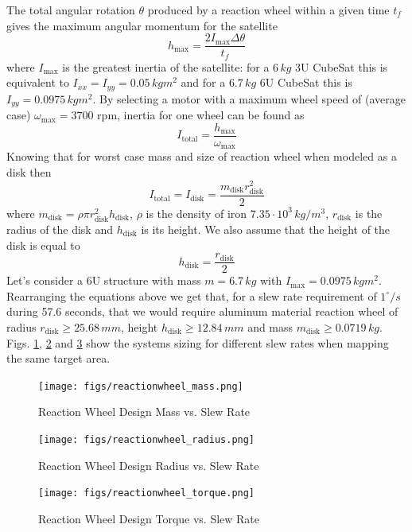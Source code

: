 The total angular rotation $\theta$ produced by a reaction wheel within a given time $t_f$ gives the maximum angular momentum for the satellite 
\begin{equation}
    h_{\text{max}} = \frac{2I_{\text{max}}\Delta \theta}{t_f}
\end{equation}
where $I_{\text{max}}$ is the greatest inertia of the satellite: for a $6 \hspace{2pt} kg$ 3U CubeSat this is equivalent to $I_{xx}=I_{yy}=0.05 \hspace{2pt} kgm^2$ and for a $6.7 \hspace{2pt} kg$ 6U CubeSat this is $I_{yy}=0.0975 \hspace{2pt} kgm^2$. By selecting a motor with a maximum wheel speed of (average case) $\omega_{\text{max}}=3700$ rpm, inertia for one wheel can be found as
\begin{equation}
    I_{\text{total}} = \frac{ h_{\text{max}}}{\omega_{\text{max}}}
\end{equation}
Knowing that for worst case mass and size of reaction wheel when modeled as a disk then
\begin{equation}
    I_{\text{total}} = I_{\text{disk}} = \frac{m_{\text{disk}}r^2_{\text{disk}}}{2}
\end{equation}
where $m_{\text{disk}}=\rho\pi r^2_{\text{disk}}h_{\text{disk}}$, $\rho$ is the density of iron $7.35\cdot10^{3} \hspace{2pt} kg/m^3$, $r_{\text{disk}}$ is the radius of the disk and $h_{\text{disk}}$ is its height. We also assume that the height of the disk is equal to
\begin{equation}
    h_{\text{disk}} = \frac{r_{\text{disk}}}{2}
\end{equation}
Let's consider a 6U structure with mass $m = 6.7 \hspace{2pt} kg$ with $I_{\text{max}}=0.0975 \hspace{2pt} kgm^2$. Rearranging the equations above we get that, for a slew rate requirement of $1^{\circ}/s$ during 57.6 seconds, that we would require aluminum material reaction wheel of radius $r_{\text{disk}}\geq 25.68 \hspace{2pt} mm$, height $h_{\text{disk}} \geq 12.84 \hspace{2pt} mm$ and mass $m_{\text{disk}} \geq 0.0719 \hspace{2pt} kg$. Figs. \ref{fig:RW_mass}, \ref{fig:RW_radius} and \ref{fig:RW_torque} show the systems sizing for different slew rates when mapping the same target area.
\begin{figure}[htbp]
  \centering
    \texttt{[image: figs/reactionwheel\_mass.png]}
    \caption{Reaction Wheel Design Mass vs. Slew Rate}
    \label{fig:RW_mass}
\end{figure}
\begin{figure}[htbp]
  \centering
    \texttt{[image: figs/reactionwheel\_radius.png]}
    \caption{Reaction Wheel Design Radius vs. Slew Rate}
    \label{fig:RW_radius}
\end{figure}
\begin{figure}[htbp]
  \centering
    \texttt{[image: figs/reactionwheel\_torque.png]}
    \caption{Reaction Wheel Design Torque vs. Slew Rate}
    \label{fig:RW_torque}
\end{figure}
